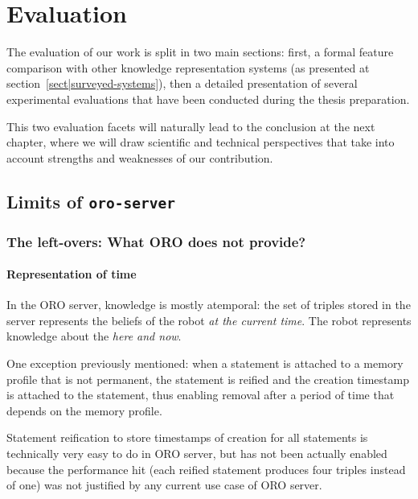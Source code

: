 \chapter{Evaluation}
\label{chapter|evaluation}

The evaluation of our work is split in two main sections: first, a formal
feature comparison with other knowledge representation systems (as presented at
section~\ref{sect|surveyed-systems}), then a detailed presentation of several
experimental evaluations that have been conducted during the thesis preparation.


This two evaluation facets will naturally lead to the conclusion at the next
chapter, where we will draw scientific and technical perspectives that take
into account strengths and weaknesses of our contribution.

\section{Limits of {\tt oro-server}}
\label{sect|limits-oroserver}

\subsection{The left-overs: What ORO does not provide?}

\subsubsection{Representation of time}

In the ORO server, knowledge is mostly atemporal: the set of triples stored in
the server represents the beliefs of the robot \emph{at the current time}. The
robot represents knowledge about the \emph{here and now}.

One exception previously mentioned: when a statement is attached to a memory
profile that is not permanent, the statement is reified and the creation
timestamp is attached to the statement, thus enabling removal after a period of
time that depends on the memory profile.

Statement reification to store timestamps of creation for all statements is
technically very easy to do in ORO server, but has not been actually enabled
because the performance hit (each reified statement produces four triples
instead of one) was not justified by any current use case of ORO server.

